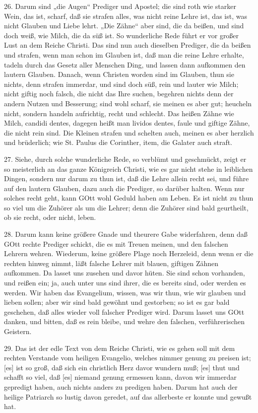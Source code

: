 26. Darum sind „die Augen“ Prediger und Apostel; die sind roth wie starker Wein, das ist, scharf, daß sie strafen alles, was nicht reine Lehre ist, das ist, was nicht Glauben und Liebe lehrt. „Die Zähne“ aber sind, die da beißen, und sind doch weiß, wie Milch, die da süß ist. So wunderliche Rede führt er vor großer Lust an dem Reiche Christi. Das sind nun auch dieselben Prediger, die da beißen und strafen, wenn man schon im Glauben ist, daß man die reine Lehre erhalte, tadeln durch das Gesetz aller Menschen Ding, und lassen dann aufkommen den lautern Glauben. Danach, wenn Christen worden sind im Glauben, thun sie nichts, denn strafen immerdar, und sind doch süß, rein und lauter wie Milch; nicht giftig noch falsch, die nicht das Ihre suchen, begehren nichts denn der andern Nutzen und Besserung; sind wohl scharf, sie meinen es aber gut; heucheln nicht, sondern handeln aufrichtig, recht und schlecht. Das heißen Zähne wie Milch, candidi dentes, dagegen heißt man lividos dentes, faule und giftige Zähne, die nicht rein sind. Die Kleinen strafen und schelten auch, meinen es aber herzlich und brüderlich; wie St. Paulus die Corinther, item, die Galater auch straft.

27. Siehe, durch solche wunderliche Rede, so verblümt und geschmückt, zeigt er so meisterlich an das ganze Königreich Christi, wie es gar nicht stehe in leiblichen Dingen, sondern nur darum zu thun ist, daß die Lehre allein recht sei, und führe auf den lautern Glauben, dazu auch die Prediger, so darüber halten. Wenn nur solches recht geht, kann GOtt wohl Geduld haben am Leben. Es ist nicht zu thun so viel um die Zuhörer als um die Lehrer; denn die Zuhörer sind bald geurtheilt, ob sie recht, oder nicht, leben.

28. Darum kann keine größere Gnade und theurere Gabe widerfahren, denn daß GOtt rechte Prediger schickt, die es mit Treuen meinen, und den falschen Lehrern wehren. Wiederum, keine größere Plage noch Herzeleid, denn wenn er die rechten hinweg nimmt, läßt falsche Lehrer mit blauen, giftigen Zähnen aufkommen. Da lasset uns zusehen und davor hüten. Sie sind schon vorhanden, und reißen ein; ja, auch unter uns sind ihrer, die es bereits sind, oder werden es werden. Wir haben das Evangelium, wissen, was wir thun, wie wir glauben und lieben sollen; aber wir sind bald gewöhnt und gestorben; so ist es gar bald geschehen, daß alles wieder voll falscher Prediger wird. Darum lasset uns GOtt danken, und bitten, daß es rein bleibe, und wehre den falschen, verführerischen Geistern.

29. Das ist der edle Text von dem Reiche Christi, wie es gehen soll mit dem rechten Verstande vom heiligen Evangelio, welches nimmer genung zu preisen ist; [es] ist so groß, daß sich ein christlich Herz davor wundern muß; [es] thut und schafft so viel, daß [es] niemand genung ermessen kann, davon wir immerdar gepredigt haben, auch nichts anders zu predigen haben. Darum hat auch der heilige Patriarch
so lustig davon geredet, auf das allerbeste er konnte und gewußt hat.

